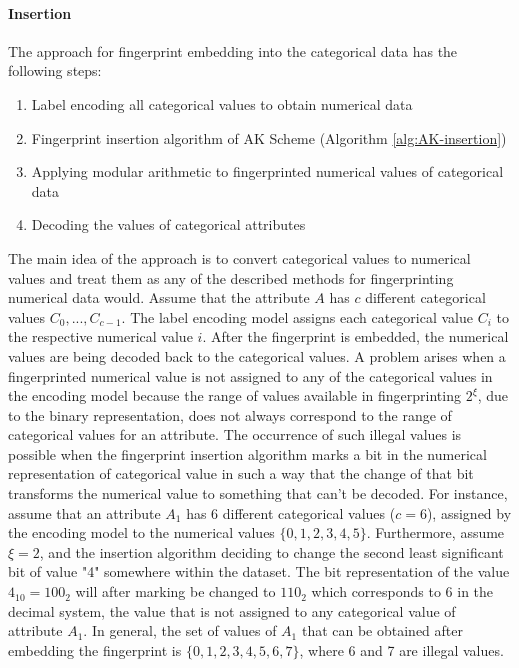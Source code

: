 \paragraph{Insertion}
The approach for fingerprint embedding into the categorical data has the following steps:
\begin{enumerate}
    \item Label encoding all categorical values to obtain numerical data
    \item Fingerprint insertion algorithm of AK Scheme (Algorithm \ref{alg:AK-insertion})
    \item Applying modular arithmetic to fingerprinted numerical values of categorical data
    \item Decoding the values of categorical attributes
\end{enumerate}
The main idea of the approach is to convert categorical values to numerical values and treat them as any of the described methods for fingerprinting numerical data would. 
Assume that the attribute $A$ has $c$ different categorical values $C_0, ..., C_{c-1}$.
The label encoding model assigns each categorical value $C_i$ to the respective numerical value $i$.
After the fingerprint is embedded, the numerical values are being decoded back to the categorical values. 
A problem arises when a fingerprinted numerical value is not assigned to any of the categorical values in the encoding model because the range of values available in fingerprinting $2^\xi$, due to the binary representation, does not always correspond to the range of categorical values for an attribute.
The occurrence of such illegal values is possible when the fingerprint insertion algorithm marks a bit in the numerical representation of categorical value in such a way that the change of that bit transforms the numerical value to something that can't be decoded. 
For instance, assume that an attribute $A_1$ has 6 different categorical values ($c=6$), assigned by the encoding model to the numerical values $\{0,1,2,3,4,5\}$. 
Furthermore, assume $\xi=2$, and the insertion algorithm deciding to change the second least significant bit of value "4" somewhere within the dataset. 
The bit representation of the value $4_{10}=100_2$ will after marking be changed to $110_2$ which corresponds to $6$ in the decimal system, the value that is not assigned to any categorical value of attribute $A_1$. 
In general, the set of values of $A_1$ that can be obtained after embedding the fingerprint is $\{0,1,2,3,4,5,6,7\}$, where 6 and 7 are illegal values. 

